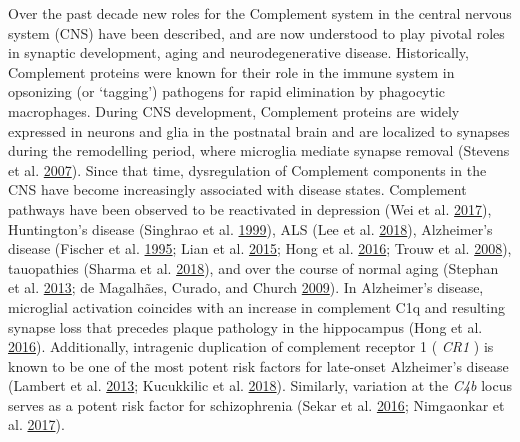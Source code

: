 \documentclass[onehalf,12pt]{beavtex}
\begin{document}
  Over the past decade new roles for the Complement system in the central
  nervous system (CNS) have been described, and are now understood to play
  pivotal roles in synaptic development, aging and neurodegenerative
  disease. Historically, Complement proteins were known for their role in
  the immune system in opsonizing (or `tagging') pathogens for rapid
  elimination by phagocytic macrophages. During CNS development,
  Complement proteins are widely expressed in neurons and glia in the
  postnatal brain and are localized to synapses during the remodelling
  period, where microglia mediate synapse removal (Stevens et al.
  \protect\hyperlink{ref-StevensClassicalComplementCascade2007}{2007}).
  Since that time, dysregulation of Complement components in the CNS have
  become increasingly associated with disease states. Complement pathways
  have been observed to be reactivated in depression (Wei et al.
  \protect\hyperlink{ref-WeiPlasmacomplementcomponent2017}{2017}),
  Huntington's disease (Singhrao et al.
  \protect\hyperlink{ref-SinghraoIncreasedcomplementbiosynthesis1999}{1999}),
  ALS (Lee et al.
  \protect\hyperlink{ref-LeeComplementcomponentsare2018}{2018}),
  Alzheimer's disease (Fischer et al.
  \protect\hyperlink{ref-FischerComplementC1qC31995}{1995}; Lian et al.
  \protect\hyperlink{ref-LianNFkBActivatedAstroglialRelease2015}{2015};
  Hong et al.
  \protect\hyperlink{ref-HongComplementmicrogliamediate2016}{2016}; Trouw
  et al.
  \protect\hyperlink{ref-TrouwC4bbindingproteinAlzheimer2008}{2008}),
  tauopathies (Sharma et al.
  \protect\hyperlink{ref-SharmaPresymptomaticchangemicroRNAs2018}{2018}),
  and over the course of normal aging (Stephan et al.
  \protect\hyperlink{ref-StephanDramaticIncreaseC1q2013}{2013}; de
  Magalhães, Curado, and Church
  \protect\hyperlink{ref-deMagalhaesMetaanalysisagerelatedgene2009}{2009}).
  In Alzheimer's disease, microglial activation coincides with an increase
  in complement C1q and resulting synapse loss that precedes plaque
  pathology in the hippocampus (Hong et al.
  \protect\hyperlink{ref-HongComplementmicrogliamediate2016}{2016}).
  Additionally, intragenic duplication of complement receptor 1 (
  \emph{CR1} ) is known to be one of the most potent risk factors for
  late-onset Alzheimer's disease (Lambert et al.
  \protect\hyperlink{ref-LambertMetaanalysis740462013}{2013}; Kucukkilic
  et al.
  \protect\hyperlink{ref-KucukkilicComplementreceptorgene2018}{2018}).
  Similarly, variation at the \emph{C4b} locus serves as a potent risk
  factor for schizophrenia (Sekar et al.
  \protect\hyperlink{ref-SekarSchizophreniariskcomplex2016}{2016};
  Nimgaonkar et al.
  \protect\hyperlink{ref-Nimgaonkarcomplementsystemgateway2017}{2017}).
  
\end{document}

